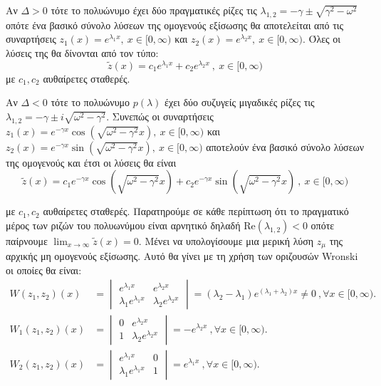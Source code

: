 \documentclass[a4paper,twoside,11pt]{book}
\begin{document}
\begin{rlist}
\item Αν $ \Delta>0 $ τότε το πολυώνυμο έχει δύο πραγματικές ρίζες τις $ \lambda_{1,2}=-\gamma\pm\sqrt{\gamma^2-\omega^2} $ οπότε ένα βασικό σύνολο λύσεων της ομογενούς εξίσωσης θα αποτελείται από τις συναρτήσεις $ z_1(x)=e^{\lambda_1 x},\ x\in[0,\infty) $ και $ z_2(x)=e^{\lambda_2 x},\ x\in[0,\infty) $. Όλες οι λύσεις της θα δίνονται από τον τύπο:
\[ \tilde{z}(x)=c_1e^{\lambda_1 x}+c_2e^{\lambda_2 x}\ ,\ x\in[0,\infty) \]
με $ c_1,c_2 $ αυθαίρετες σταθερές.
\item Αν $ \Delta<0 $ τότε το πολυώνυμο $ p(\lambda) $ έχει δύο συζυγείς μιγαδικές ρίζες τις $ \lambda_{1,2}=-\gamma\pm i\sqrt{\omega^2-\gamma^2} $. Συνεπώς οι συναρτήσεις $ z_1(x)=e^{-\gamma x}\cos{\left( \sqrt{\omega^2-\gamma^2} x\right) },\ x\in[0,\infty) $ και $ z_2(x)=e^{-\gamma x}\sin{\left( \sqrt{\omega^2-\gamma^2} x\right) },\ x\in[0,\infty) $ αποτελούν ένα βασικό σύνολο λύσεων της ομογενούς και έτσι οι λύσεις θα είναι
\[ \tilde{z}(x)=c_1e^{-\gamma x}\cos{\left( \sqrt{\omega^2-\gamma^2} x\right)}+c_2e^{-\gamma x}\sin{\left( \sqrt{\omega^2-\gamma^2} x\right)}\ ,\ x\in[0,\infty) \]
\end{rlist}
με $ c_1,c_2 $ αυθαίρετες σταθερές. Παρατηρούμε σε κάθε περίπτωση ότι το πραγματικό μέρος των ριζών του πολυωνύμου είναι αρνητικό δηλαδή $ \textrm{Re}(\lambda_{1,2})<0 $ οπότε παίρνουμε $ \lim_{ x\rightarrow\infty }{\tilde{z}(x)}=0 $. Μένει να υπολογίσουμε μια μερική λύση $ z_\mu $ της αρχικής μη ομογενούς εξίσωσης. Αυτό θα γίνει με τη χρήση των οριζουσών Wronski οι οποίες θα είναι:
\begin{align*}
W(z_1,z_2)(x)&=\begin{vmatrix}
e^{\lambda_1 x} & e^{\lambda_2 x}\\
\lambda_1e^{\lambda_1 x} & \lambda_2e^{\lambda_2 x}
\end{vmatrix}=(\lambda_2-\lambda_1)e^{(\lambda_1+\lambda_2)x}\neq 0\ ,\forall x\in[0,\infty).\\
W_1(z_1,z_2)(x)&=\begin{vmatrix}
0 & e^{\lambda_2 x}\\
1 & \lambda_2e^{\lambda_2 x}
\end{vmatrix}=-e^{\lambda_2x}\ ,\forall x\in[0,\infty).\\
W_2(z_1,z_2)(x)&=\begin{vmatrix}
e^{\lambda_1 x} & 0\\
\lambda_1e^{\lambda_1 x} & 1
\end{vmatrix}=e^{\lambda_1x}\ ,\forall x\in[0,\infty).
\end{align*}
\end{document}
